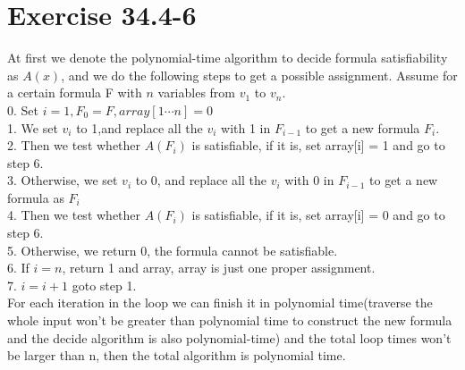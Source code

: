 \documentclass[oneside]{homework} %
\begin{document}
\maketitle
\newpage
\section{Exercise 34.4-6}
At first we denote the polynomial-time algorithm to decide formula satisfiability as $A(x)$, and we do the following steps to get a possible assignment. 
Assume for a certain formula F with $n$ variables from $v_{1}$ to $v_{n}$.\\
0. Set $i = 1,F_{0} = F,array[1\cdots n] = 0$ \\
1. We set $v_{i}$ to 1,and replace all the $v_{i}$ with 1 in $F_{i-1}$ to get a new formula $F_{i}$.\\
2. Then we test whether $A(F_{i})$ is satisfiable, if it is, set array[i] = 1 and go to step 6.\\
3. Otherwise, we set $v_{i}$ to 0, and replace all the $v_{i}$ with 0 in $F_{i-1}$ to get a new formula as $F_{i}$\\
4. Then we test whether $A(F_{i})$ is satisfiable, if it is, set array[i] = 0 and go to step 6.\\
5. Otherwise, we return 0, the formula cannot be satisfiable.\\
6. If $i = n $, return 1 and array, array is just one proper assignment.\\
7. $i=i+1$ goto step 1. \\

For each iteration in the loop we can finish it in polynomial time(traverse the whole input won't be greater than polynomial time to construct the new formula and the decide algorithm is also polynomial-time)  and the total loop times won't be larger than n, then the total algorithm is polynomial time.
\end{document}
